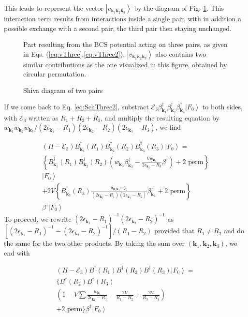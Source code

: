 \documentclass[aps,prb,amsmath,amssymb,superscriptaddress,twocolumn]{revtex4-1}
\newcommand{\vk}{\ensuremath{\mathbf{k}}}
\newcommand{\E}{\ensuremath{\mathbf{E}}}
\newcommand{\ket}[1]{\ensuremath{\left|#1\right>}}
\newcommand{\br}[1]{\ensuremath{\left(#1\right)}}
\newcommand{\mbr}[1]{\ensuremath{\left[#1\right]}}
\newcommand{\bbr}[1]{\ensuremath{\left\{#1\right\}}}
\newcommand{\fo}{\ensuremath{\ket{F_0}}}
\renewcommand{\E}{\ensuremath{\mathcal{E}}}
\begin{document}
This leads to represent the vector $\ket{v_{\vk_1\vk_2\vk_3}}$ by the diagram of Fig. \ref{fig:threeP}. This interaction term results from  interactions inside a single pair, with in addition  a possible exchange with a second pair, the third pair then staying unchanged. 
\begin{figure}[htb]
 \caption{Shiva diagram of two pairs \label{fig:threeP}}
Part resulting from the BCS potential acting on three pairs, as given in Eqs. (\ref{eq:vThree},\ref{eq:vThree2}). $\ket{v_{\vk_1\vk_2\vk_3}}$ also contains two similar contributions as the one visualized in this figure, obtained by circular permutation. 
\end{figure}

If we come back to Eq. \eqref{eq:SchThree2}, substract $\E_3\beta^{\dagger}_{\vk_1}\beta^{\dagger}_{\vk_2}\beta^{\dagger}_{\vk_3}\fo$ to both sides, with $\E_3$ written as $R_1+R_2+R_3$, and multiply the resulting equation by $w_{\vk_1}w_{\vk_2}w_{\vk_3}/\br{2\epsilon_{\vk_1}-R_1}\br{2\epsilon_{\vk_2}-R_2}\br{2\epsilon_{\vk_3}-R_3}$, we find

\begin{multline}\label{eq:SchThree3}
(H-\E_3)B^{\dagger}_{\vk_1}(R_1)B^{\dagger}_{\vk_2}(R_2)B^{\dagger}_{\vk_3}(R_3)\fo=\\
\bbr{B^{\dagger}_{\vk_1}(R_1)B^{\dagger}_{\vk_2}(R_2)\br{w_{\vk_3}\beta^{\dagger}_{\vk_3}-\frac{Vw_{\vk_3}}{2\epsilon_{\vk_2}-R_3}\beta^{\dagger}}+\text{2 perm}}\\\fo\\
+2V\bbr{B^{\dagger}_{\vk_3}(R_3)\frac{\delta_{\vk_1\vk_2}w_{\vk_1}}{\br{2\epsilon_{\vk_1}-R_1}\br{2\epsilon_{\vk_1}-R_2}}\beta^{\dagger}_{\vk_1}+\text{2 perm}}\\\beta^{\dagger}\fo
\end{multline}
To proceed, we rewrite  $\br{2\epsilon_{\vk_1}-R_1}^{-1}\br{2\epsilon_{\vk_2}-R_2}^{-1}$  as 
$\mbr{\br{2\epsilon_{\vk_1}-R_1}^{-1}-\br{2\epsilon_{\vk_2}-R_2}^{-1}}/\br{R_1-R_2}$ provided that $R_1\neq{}R_2$ and do the same for the two other products. By taking the sum over $\br{\vk_1,\vk_2,\vk_3}$, we end with 

\begin{multline}\label{eq:SchThree4}
(H-\E_3)B^{\dagger}(R_1)B^{\dagger}(R_2)B^{\dagger}(R_3)\fo=\\
\{B^{\dagger}(R_2)B^{\dagger}(R_3)\\
\br{1-V\sum\frac{w_{\vk_1}}{2\epsilon_{\vk_1}-R_1}-\frac{2V}{R_1-R_2}+\frac{2V}{R_3-R_1}}\\+\text{2 perm}\}\beta^{\dagger}\fo
\end{multline}
\end{document}
